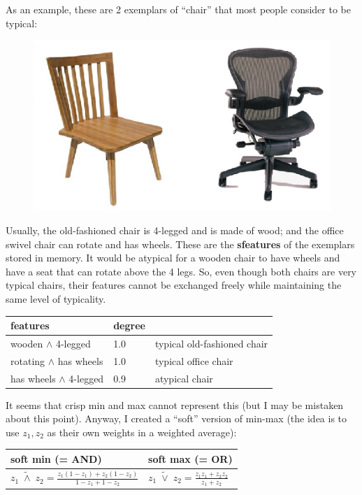 As an example, these are 2 exemplars of ``chair'' that most people consider to be typical:
\begin{figure}[H]
\centering
\includegraphics{2-chairs.ps}
\end{figure}
Usually, the old-fashioned chair is 4-legged and is made of wood; and the office swivel chair can rotate and has wheels.  These are the \textbf{sfeatures} of the exemplars stored in memory.  It would be atypical for a wooden chair to have wheels and have a seat that can rotate above the 4 legs.  So, even though both chairs are very typical chairs, their features cannot be exchanged freely while maintaining the same level of typicality.

\hspace*{1cm} \begin{tabular}{|l|l|l|} \hline
\textbf{features}            & \textbf{degree} &\\ \hline
wooden $\wedge$ 4-legged     & 1.0             & typical old-fashioned chair\\
rotating $\wedge$ has wheels & 1.0             & typical office chair\\
has wheels $\wedge$ 4-legged & 0.9             & atypical chair\\
\hline
\end{tabular}

It seems that crisp min and max cannot represent this (but I may be mistaken about this point).  Anyway, I created a ``soft'' version of min-max (the idea is to use $z_1, z_2$ as their own weights in a weighted average):

\hspace*{1cm} \begin{tabular}{|l|l|}
\hline
{\textbf{soft min (= AND)}} & {\textbf{soft max (= OR)}}\\ \hline
\rule[-7mm]{0mm}{16mm} 
$\displaystyle z_1 \; \widetilde{\wedge} \; z_2 = \frac{z_1 (1-z_1) + z_2 (1-z_2)}{1 - z_1 + 1 - z_2} $
& $\displaystyle z_1 \; \widetilde{\vee} \; z_2 = \frac{z_1 z_1 + z_2 z_2}{z_1 + z_2} $ \\
\hline
\end{tabular}
\parbox{4cm}{\begin{equation}
\label{eqn:soft-min-max}
\end{equation}}

